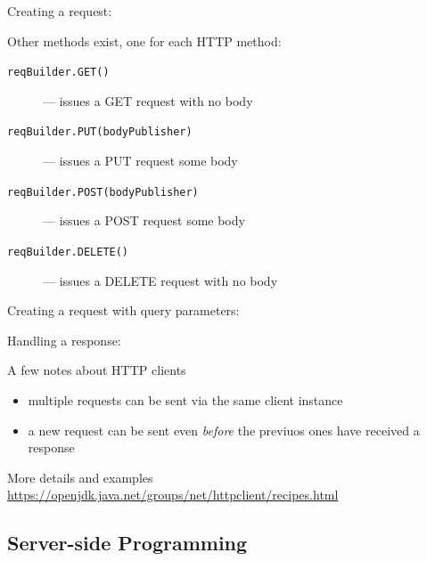 \documentclass[presentation]{beamer}\mode<presentation>{\usetheme{AMSBolognaFC}}
\begin{document}
\begin{frame}[allowframebreaks]
    \framebreak

    Creating a request:
    

    \framebreak

    Other methods exist, one for each HTTP method:
    \begin{description}
        \item[\texttt{reqBuilder.GET()}] --- issues a GET request with no body
        \item[\texttt{reqBuilder.PUT(bodyPublisher)}] --- issues a PUT request some body
        \item[\texttt{reqBuilder.POST(bodyPublisher)}] --- issues a POST request some body
        \item[\texttt{reqBuilder.DELETE()}] --- issues a DELETE request with no body
    \end{description}

    \framebreak

    Creating a request with query parameters:
    

    \framebreak

    Handling a response:
    

    \framebreak

    \begin{alertblock}{A few notes about HTTP clients}
        \begin{itemize}
            \item multiple requests can be sent via the same client instance
            \item a new request can be sent even \emph{before} the previuos ones have received a response
        \end{itemize}
    \end{alertblock}

    \bigskip

    \begin{exampleblock}{More details and examples}\centering
        \url{https://openjdk.java.net/groups/net/httpclient/recipes.html}
    \end{exampleblock}

\end{frame}

\subsection{Server-side Programming}
\end{document}
